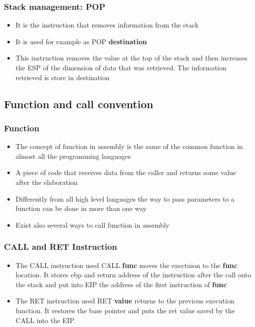 \documentclass[]{beamer}
\begin{document}
 \begin{frame}
      \frametitle{Stack management: POP}
        \begin{itemize}
            \item{It is the instruction that removes information from the stack}
            \item{It is used for example as  POP {\bf destination} }
            \item{This instruction removes the value at the top of the stack and then increases the ESP of the dimension of data that was retrieved. The information retrieved is store in destination}
        \end{itemize}
      \end{frame}

\subsection{Function and call convention}
		\begin{frame}
			\frametitle{Function}
			\begin{itemize}
				\item{The concept of function in assembly is the same of the common function in almost all the programming languages }
				\item{A piece of code that receives data from the caller and returns some value after the elaboration}
				\item{Differently from all high level languages the way to pass parameters to a function can be done in more than one way}
				\item{Exist also several ways to call function in assembly}
			\end{itemize}
		\end{frame}
      \begin{frame}
      \frametitle{CALL and RET Instruction}
        \begin{itemize}
            \item{The CALL instruction used  CALL {\bf func} moves the exectuion to the {\bf func} location. It stores ebp and return address of the instruction after the call onto the stack and put into EIP the address of the first instruction of {\bf func}}
            \item{The RET instruction used RET {\bf value} returns to the previous execution function. It restores the base pointer and puts the ret value saved by the CALL into the EIP.}
        \end{itemize}
     \end{frame}
\end{document}
